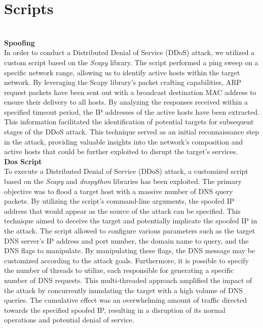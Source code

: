 \section{Scripts}
\\
\textbf{Spoofing}\\
In order to conduct a Distributed Denial of Service (DDoS) attack, we utilized a custom script based on the \textit{Scapy} library. The script performed a ping sweep on a 
specific network range, allowing us to identify active hosts within the target network. By leveraging the Scapy library's packet crafting capabilities,
ARP request packets have been sent out with a broadcast destination MAC address to ensure their delivery to all hosts. By analyzing the responses received 
within a specified timeout period, the IP addresses of the active hosts have been extracted. This information facilitated the identification of potential targets for 
subsequent stages of the DDoS attack. This technique served as an initial reconnaissance step in the attack, providing valuable insights into the 
network's composition and active hosts that could be further exploited to disrupt the target's services.
\\
\textbf{Dos Script}\\
To execute a Distributed Denial of Service (DDoS) attack, a customized script based on the \textit{Scapy} and \textit{dnspython} 
libraries has been exploited. The primary objective 
was to flood a target host with a massive number of DNS query packets. By utilizing the script's command-line arguments, the spoofed 
IP address that would appear as the source of the attack can be specified. This technique aimed to deceive the target and potentially implicate the spoofed IP in 
the attack. The script allowed to configure various parameters such as the target DNS server's IP address and port number, the domain name to 
query, and the DNS flags to manipulate. By manipulating these flags, the DNS message may be customized according to the attack goals. Furthermore, 
it is possible to specify the number of threads to utilize, each responsible for generating a specific number of DNS requests. This multi-threaded approach 
amplified the impact of the attack by concurrently inundating the target with a high volume of DNS queries. The cumulative effect was an overwhelming 
amount of traffic directed towards the specified spoofed IP, resulting in a disruption of its normal operations and potential denial of service.
